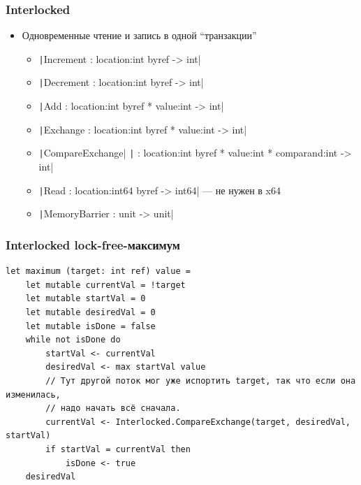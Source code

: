 \documentclass{../../slides-style}
\begin{document}
    \begin{frame}
        \frametitle{Interlocked}
        \begin{itemize}
            \item Одновременные чтение и запись в одной ``транзакции''
            \begin{itemize}
                \item \texttt|Increment : location:int byref -> int|
                \item \texttt|Decrement : location:int byref -> int|
                \item \texttt|Add : location:int byref * value:int -> int|
                \item \texttt|Exchange : location:int byref * value:int -> int|
                \item \texttt|CompareExchange|
                        \texttt|        : location:int byref * value:int * comparand:int -> int|
                \item \texttt|Read : location:int64 byref -> int64| --- не нужен в x64
                \item \texttt|MemoryBarrier : unit -> unit|
            \end{itemize}
        \end{itemize}
    \end{frame}

    \begin{frame}[fragile]
        \frametitle{Interlocked lock-free-максимум}
        \begin{footnotesize}
            \begin{verbatim}
let maximum (target: int ref) value =
    let mutable currentVal = !target
    let mutable startVal = 0
    let mutable desiredVal = 0
    let mutable isDone = false
    while not isDone do
        startVal <- currentVal
        desiredVal <- max startVal value
        // Тут другой поток мог уже испортить target, так что если она изменилась,
        // надо начать всё сначала.
        currentVal <- Interlocked.CompareExchange(target, desiredVal, startVal)
        if startVal = currentVal then
            isDone <- true
    desiredVal
            \end{verbatim}
        \end{footnotesize}
    \end{frame}
\end{document}
